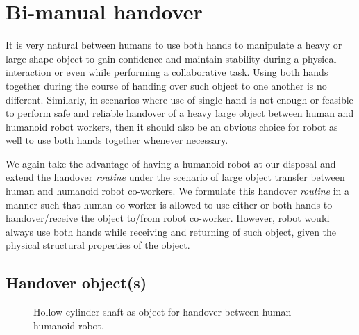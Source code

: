 
\section{Bi-manual handover}\label{both hands together}

It is very natural between humans to use both hands to manipulate a heavy or large shape object to gain confidence and maintain stability during a physical interaction or even while performing a collaborative task. Using both hands together during the course of handing over such object to one another is no different. Similarly, in scenarios where use of single hand is not enough or feasible to perform safe and reliable handover of a heavy large object between human and humanoid robot workers, then it should also be an obvious choice for robot as well to use both hands together whenever necessary. 


We again take the advantage of having a humanoid robot at our disposal and extend the handover \textit{routine} under the scenario of large object transfer between human and humanoid robot co-workers. We formulate this handover \textit{routine} in a manner such that human co-worker is allowed to use either or both hands to handover/receive the object to/from robot co-worker. However, robot would always use both hands while receiving and returning of such object, given the physical structural properties of the object.

\subsection{Handover object(s)}


\begin{figure}[hpt]
	\caption{Hollow cylinder shaft as object for handover between human humanoid robot.}
	\label{fig:pipe_ex}
\end{figure}


